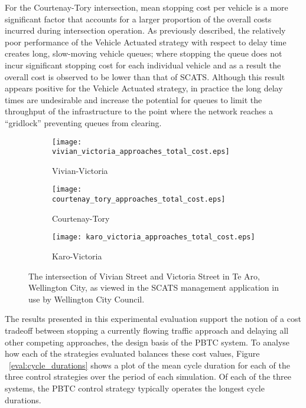 {For the Courtenay-Tory intersection, mean stopping cost per vehicle is a more significant factor that accounts for a larger proportion of the overall costs incurred during intersection operation. As previously described, the relatively poor performance of the Vehicle Actuated strategy with respect to delay time creates long, slow-moving vehicle queues; where stopping the queue does not incur significant stopping cost for each individual vehicle and as a result the overall cost is observed to be lower than that of SCATS. Although this result appears positive for the Vehicle Actuated strategy, in practice the long delay times are undesirable and increase the potential for queues to limit the throughput of the infrastructure to the point where the network reaches a ``gridlock'' preventing queues from clearing. 

\begin{figure}
\centering
\begin{subfigure}{.5\textwidth}
  \centering
  \texttt{[image: vivian\_victoria\_approaches\_total\_cost.eps]}
  \caption{Vivian-Victoria}
  \label{total_cost:sub1}
\end{subfigure}%
\begin{subfigure}{.5\textwidth}
  \centering
  \texttt{[image: courtenay\_tory\_approaches\_total\_cost.eps]}
  \caption{Courtenay-Tory}
  \label{total_cost:sub2}
\end{subfigure}

\vspace{1cm}

\begin{subfigure}{.5\textwidth}
  \centering
  \texttt{[image: karo\_victoria\_approaches\_total\_cost.eps]}
  \caption{Karo-Victoria}
  \label{total_cost:sub3}
\end{subfigure}%
\caption{The intersection of Vivian Street and Victoria Street in Te Aro, Wellington City, as viewed in the SCATS management application in use by Wellington City Council. }
\label{eval:total_cost}
\end{figure}

The results presented in this experimental evaluation support the notion of a cost tradeoff between stopping a currently flowing traffic approach and delaying all other competing approaches, the design basis of the PBTC system. To analyse how each of the strategies evaluated balances these cost values, Figure ~\ref{eval:cycle_durations} shows a plot of the mean cycle duration for each of the three control strategies over the period of each simulation. Of each of the three systems, the PBTC control strategy typically operates the longest cycle durations.

}
